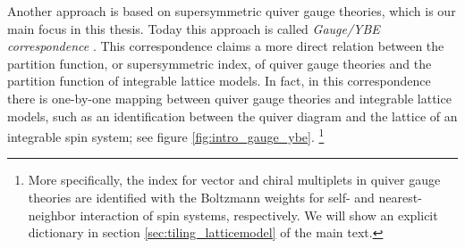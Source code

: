 Another approach is based on supersymmetric quiver gauge theories, which is our main focus in this thesis.
Today this approach is called \emph{Gauge/YBE correspondence} \cite{Yamazaki:2012cp,Terashima:2012cx,Yamazaki:2013nra}.
This correspondence claims a more direct relation between the partition function, or supersymmetric index,
of quiver gauge theories and the partition function of integrable lattice models.
In fact, in this correspondence there is one-by-one mapping
between quiver gauge theories and integrable lattice models,
such as an identification between the quiver diagram and the lattice of an integrable spin system;
see figure \ref{fig:intro_gauge_ybe}.%
%
\footnote{More specifically, the index for vector and chiral multiplets
in quiver gauge theories are identified with the Boltzmann weights for
self- and nearest-neighbor interaction of spin systems, respectively.
We will show an explicit dictionary in section \ref{sec:tiling_latticemodel} of the main text.}
%
%

